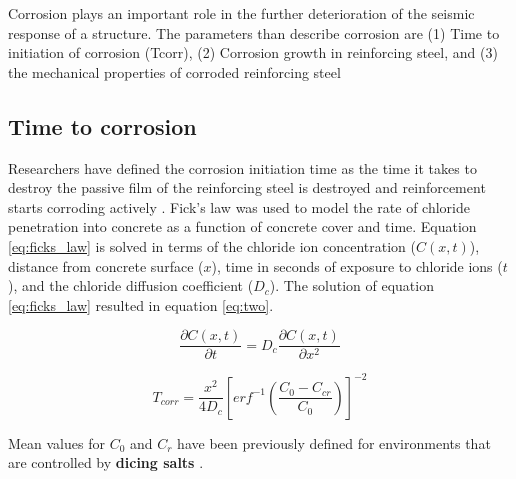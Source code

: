 Corrosion plays an important role in the further deterioration of the seismic response of a structure. The parameters than describe corrosion are (1) Time to initiation of corrosion (Tcorr), (2) Corrosion growth in reinforcing steel, and (3) the mechanical properties of corroded reinforcing steel

\subsection{Time to corrosion}

 Researchers have  defined the corrosion initiation time as the time it takes to destroy the passive film of the reinforcing steel is destroyed and reinforcement starts corroding actively \cite{Thoft-Christensen}\cite{Stewart1998}\cite{Y.Liu1998a}. Fick's law was used to model the rate of chloride penetration into concrete as a function of concrete cover and time. Equation \eqref{eq:ficks_law} is solved in terms of the chloride ion concentration ($C(x,t)$), distance from concrete surface ($x$), time in seconds of exposure to chloride ions ($t$), and the chloride diffusion coefficient ($D_c$). The solution of equation \eqref{eq:ficks_law} resulted in equation \eqref{eq:two}.

\begin{equation}
	\frac{\partial C(x,t)}{\partial t} = D_c \frac{\partial C(x,t)}{\partial x^2}
	\label{eq:ficks_law}
\end{equation}
\newline



\begin{equation}
  T_{corr}=\frac{x^2}{4 D_c} \left[erf^{-1} \left(\frac{C_0-C_{cr}}{C_0} \right) \right]^{-2}
  \label{eq.three}
\end{equation} 

Mean values for $C_0$ and $C_r$ have been previously defined for environments that are controlled by \textbf{dicing salts} \cite{Ghosh2010}\cite{Weyers1994}\cite{Enright1998}.

